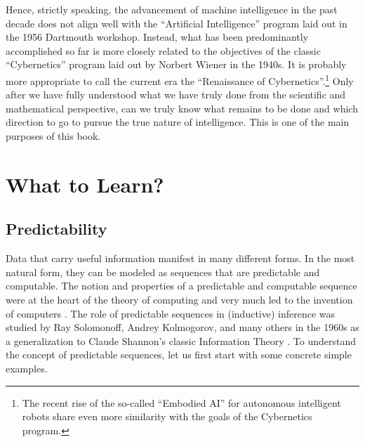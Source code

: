\documentclass[../../book-main.tex]{subfiles}
\begin{document}
Hence, strictly speaking, the advancement of machine intelligence in the past decade does not align well with the ``Artificial Intelligence'' program laid out in the 1956 Dartmouth workshop. Instead, what has been predominantly accomplished so far is more closely related to the objectives of the classic ``Cybernetics'' program laid out by Norbert Wiener in the 1940s. It is probably more appropriate to call the current era the ``Renaissance of Cybernetics''.\footnote{The recent rise of the so-called ``Embodied AI'' for autonomous intelligent robots share even more similarity with the goals of the Cybernetics program.} Only after we have fully understood what we have truly done from the scientific and mathematical perspective, can we truly know what remains to be done and which direction to go to pursue the true nature of intelligence. This is one of the main purposes of this book. 


\section{What to Learn?}
\label{sec:what-to-learn}



\subsection{Predictability}
\label{sec:predictability}
Data that carry useful information manifest in many different forms. In the most natural form, they can be modeled as sequences that are predictable and computable. The notion and properties of a predictable and computable sequence were at the heart of the theory of computing and very much led to the invention of computers \cite{Turing-1936}. The role of predictable sequences in (inductive) inference was studied by Ray Solomonoff, Andrey Kolmogorov, and many others in the 1960s \cite{Kolmogorov1998OnTO} as a generalization to Claude Shannon's classic Information Theory \cite{Shannon-1948}. To understand the concept of predictable sequences, let us first start with some concrete simple examples. 
\end{document}
